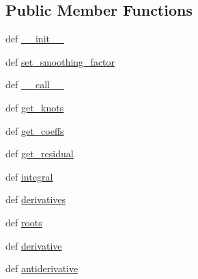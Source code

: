 \subsection*{Public Member Functions}
\begin{DoxyCompactItemize}
\item 
def \hyperlink{classscipy_1_1interpolate_1_1fitpack2_1_1UnivariateSpline_a4dcdebbf33ce222eb8f32f0364eb6edc}{\+\_\+\+\_\+init\+\_\+\+\_\+}
\item 
def \hyperlink{classscipy_1_1interpolate_1_1fitpack2_1_1UnivariateSpline_a241cdf6abaa2e61c3bdb612f50122919}{set\+\_\+smoothing\+\_\+factor}
\item 
def \hyperlink{classscipy_1_1interpolate_1_1fitpack2_1_1UnivariateSpline_a54c17348ffd515c4c304c3d11fc66de9}{\+\_\+\+\_\+call\+\_\+\+\_\+}
\item 
def \hyperlink{classscipy_1_1interpolate_1_1fitpack2_1_1UnivariateSpline_ac4583ae80b59e2fd6b0c3a87d9fac341}{get\+\_\+knots}
\item 
def \hyperlink{classscipy_1_1interpolate_1_1fitpack2_1_1UnivariateSpline_a5cc625cfd0162bb605a656d44f81f633}{get\+\_\+coeffs}
\item 
def \hyperlink{classscipy_1_1interpolate_1_1fitpack2_1_1UnivariateSpline_a1a48028d345789a69e69d2e5f16aebf1}{get\+\_\+residual}
\item 
def \hyperlink{classscipy_1_1interpolate_1_1fitpack2_1_1UnivariateSpline_a49272a30738ff870abb4dc377736fb32}{integral}
\item 
def \hyperlink{classscipy_1_1interpolate_1_1fitpack2_1_1UnivariateSpline_aea309235b930d91a31694bc181573b63}{derivatives}
\item 
def \hyperlink{classscipy_1_1interpolate_1_1fitpack2_1_1UnivariateSpline_a11233207747b516233bb2ce90350f297}{roots}
\item 
def \hyperlink{classscipy_1_1interpolate_1_1fitpack2_1_1UnivariateSpline_af417d14fa8251f8b2830e512bec0804f}{derivative}
\item 
def \hyperlink{classscipy_1_1interpolate_1_1fitpack2_1_1UnivariateSpline_a2c82074d8dad3d44f6930cbbaddd7c4a}{antiderivative}
\end{DoxyCompactItemize}


